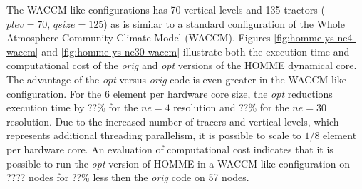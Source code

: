 The WACCM-like configurations has 70 vertical levels and 135 tractors ($plev=70$, $qsize=125$) as is similar to a standard configuration of the Whole Atmosphere Community Climate Model (WACCM).  Figures \ref{fig:homme-ys-ne4-waccm} and \ref{fig:homme-ys-ne30-waccm} illustrate both the execution time and computational cost of the {\em orig} and {\em opt} versions of the HOMME dynamical core.  The advantage of the {\em opt} versus {\em orig} code is even greater in the WACCM-like configuration.  For the 6 element per hardware core size, the {\em opt} reductions execution time by {\color{red} ??\%} for the $ne=4$ resolution and {\color{red} ??\%} for the $ne=30$ resolution. Due to the increased number of tracers and vertical levels, which represents additional threading parallelism, it is possible to scale to $1/8$ element per hardware core.  An evaluation of computational cost indicates that it is possible to run the {\em opt} version of HOMME in a WACCM-like configuration on {\color{red}????} nodes for {\color{red} ??\%} less then the {\em orig} code on 57 nodes.  

